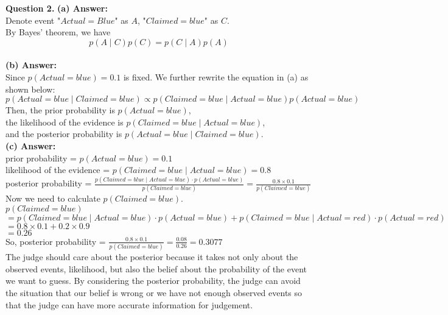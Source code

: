 \documentclass{article}
\begin{document}
\newpage
\noindent
\textbf{Question 2.}
\textbf{(a) Answer:}\\
Denote event "$Actual = Blue$" as $A$, "$Claimed = blue$" as $C$.\\
By Bayes' theorem, we have 
$$p(A \mid C)p(C) = p(C \mid A)p(A)$$\\

\noindent
\textbf{(b) Answer:}\\
Since $p(Actual = blue) = 0.1$ is fixed. We further rewrite the equation in (a) as shown below:
$$p(Actual = blue \mid Claimed = blue) \propto p(Claimed = blue \mid Actual = blue)p(Actual = blue)$$
Then, the prior probability is $p(Actual = blue)$,\\
the likelihood of the evidence is $p(Claimed = blue \mid Actual = blue)$,\\ and the posterior probability is $p(Actual = blue \mid Claimed = blue)$.\\

\noindent
\textbf{(c) Answer:}\\
prior probability = $p(Actual = blue) = 0.1$\\
likelihood of the evidence = $p(Claimed = blue \mid Actual = blue) = 0.8$\\
posterior probability = $\frac{p(Claimed = blue \mid Actual = blue) \cdot p(Actual = blue)}{p(Claimed = blue)} = \frac{0.8 \times 0.1}{p(Claimed = blue)}$\\

\noindent
Now we need to calculate $p(Claimed = blue)$.\\
$p(Claimed = blue)$\\
$= p(Claimed = blue \mid Actual = blue) \cdot p(Actual = blue) + p(Claimed = blue \mid Actual = red) \cdot p(Actual = red)$\\
$= 0.8 \times 0.1 + 0.2 \times 0.9$\\
$= 0.26$\\

\noindent
So, posterior probability = $\frac{0.8 \times 0.1}{p(Claimed = blue)} = \frac{0.08}{0.26} = 0.3077$\\

\noindent
The judge should care about the posterior because it takes not only about the observed events, likelihood, but also the belief about the probability of the event we want to guess. By considering the posterior probability, the judge can avoid the situation that our belief is wrong or we have not enough observed events so that the judge can have more accurate information for judgement.\\
\end{document}
